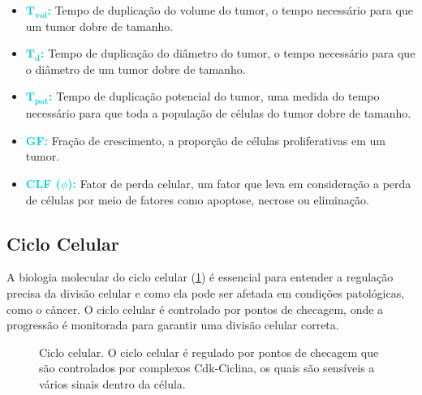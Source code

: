 \documentclass[11pt,a4paper]{article}
\begin{document}
\begin{itemize}
		\item \textcolor{DarkTurquoise}{\textbf{$\mathbf{\text{T}_\text{vol}}$:}} Tempo de duplicação do volume do tumor, o tempo necessário para que um tumor dobre de tamanho.
		\item \textcolor{DarkTurquoise}{\textbf{$\mathbf{\text{T}_\text{d}}$:}} Tempo de duplicação do diâmetro do tumor, o tempo necessário para que o diâmetro de um tumor dobre de tamanho.
		\item \textcolor{DarkTurquoise}{\textbf{$\mathbf{\text{T}_\text{pot}}$:}} Tempo de duplicação potencial do tumor, uma medida do tempo necessário para que toda a população de células do tumor dobre de tamanho.
		\item \textcolor{DarkTurquoise}{\textbf{GF:}} Fração de crescimento, a proporção de células proliferativas em um tumor.
		\item \textcolor{DarkTurquoise}{\textbf{CLF ($\phi$):}} Fator de perda celular, um fator que leva em consideração a perda de células por meio de fatores como apoptose, necrose ou eliminação.
	\end{itemize}

\subsection*{Ciclo Celular}

	A biologia molecular do ciclo celular (\ref{fig:cicloCelular}) é essencial para entender a regulação precisa da divisão celular e como ela pode ser afetada em condições patológicas, como o câncer. O ciclo celular é controlado por pontos de checagem, onde a progressão é monitorada para garantir uma divisão celular correta.

	\begin{figure}[h]
		\centering
		\caption{Ciclo celular. O ciclo celular é regulado por pontos de checagem que são controlados por complexos Cdk-Ciclina, os quais são sensíveis a vários sinais dentro da célula.}
		\label{fig:cicloCelular}
	\end{figure}
\end{document}
